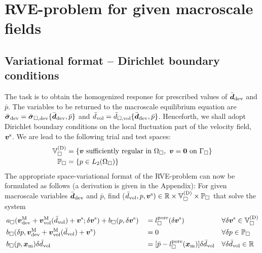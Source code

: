 \documentclass[10pt,a4paper]{article}
\newcommand{\pore}{\mathrm{pore}}
\begin{document}
\section{RVE-problem for given macroscale fields}\label{sec:rve_problem}


\subsection{Variational format -- Dirichlet boundary conditions}

The task is to obtain the homogenized response for prescribed values of $\bar{\boldsymbol{d}}_{\mathrm{dev}}$ and $\bar{p}$. The variables to be returned to the macroscale equilibrium equation are $\bar{\boldsymbol{\sigma}}_{\mathrm{dev}}=\bar{\boldsymbol{\sigma}}_{\Box,\mathrm{dev}}\{\bar{\boldsymbol{d}}_{\mathrm{dev}},\bar{p}\}$ and $\bar{d}_{\mathrm{vol}}=\bar{d}_{\Box,\mathrm{vol}}\{\bar{\boldsymbol{d}}_{\mathrm{dev}}, \bar{p}\}$. Henceforth, we shall adopt Dirichlet boundary conditions on the local fluctuation part of the velocity field, $\boldsymbol{v}^{\mathrm{s}}$. We are lead to the following trial and test spaces:
\begin{align}
    \mathbb{V}_\Box^{(\mathrm{D})} &= \{\boldsymbol{v} \mbox{ sufficiently regular in } \Omega_\Box, \,\, \boldsymbol{v}=\boldsymbol{0}\,\,\mbox{on}\,\,\Gamma_\Box\}
\label{eq212}\\
    \mathbb{P}_\Box &= \{p\in L_2(\Omega_\Box)\}
\label{eq212}
\end{align}
The appropriate space-variational format of the RVE-problem can now be formulated as follows (a derivation is given in the Appendix): For given macroscale variables $\bar{\boldsymbol{d}}_{\mathrm{dev}}$ and $\bar{p}$,
find ($\bar{d}_{\mathrm{vol}},p,\boldsymbol{v}^{\mathrm{s}})\in\mathbb{R}\times\mathbb{V}_\Box^{(\mathrm{D})}\times\mathbb{P}_\Box$ that solve the system
\begin{align}
    \label{eq213a} & a_\Box(\ta{v}^\macro_\dev + \ta{v}^\macro_\vol(\bar{d}_\vol)+\ta{v}^\fluct;\delta \ta{v}^\fluct) +  b_\Box(p,\delta\ta{v}^\fluct)
    && =
    l^\pore_\Box(\delta \ta{v}^\fluct)
    && \forall \delta \ta{v}^\fluct\in\set{V}_\Box^{(\Dirichlet)}
 \\
    \label{eq213b} & b_\Box(\delta p,\ta{v}^\macro_\dev + \ta{v}^\macro_\vol(\bar{d}_\vol)+\ta{v}^\fluct)
    && =
    0
    && \forall \delta p\in\set{P}_\Box
\\
    \label{eq213c} & b_\Box(p,\ta{x}_\mean)\delta\bar{d}_\vol
    && =
    [\bar{p} - l_\Box^\pore(\ta{x}_\mean)]\delta\bar{d}_\vol
    && \forall \delta\bar{d}_\vol  \in \set{R}
\end{align}
\end{document}
